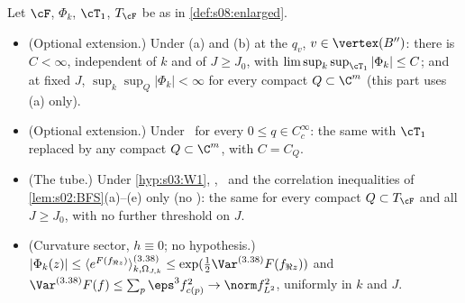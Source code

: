 \begin{lemma}\label{lem:s08:claim4}
Let $\cF$, $\Phi_k$, $\cT_1$, $T_\cF$ be as in \cref{def:s08:enlarged}.
\begin{itemize}[leftmargin=*,nosep]
\item[(A)] \textup{(Optional extension.)} Under \Wtwo(a) and \Wtwo(b) at the $q_v$, $v\in\vertex(B'')$: there is $C<\infty$, independent of $k$ and of $J\ge J_0$, with $\limsup_k\sup_{\cT_1}|\Phi_k|\le C$; and at fixed $J$, $\sup_k\sup_Q|\Phi_k|<\infty$ for every compact $Q\subset\C^m$ (this part uses \Wtwo(a) only).
\item[(A$_\infty$)] \textup{(Optional extension.)} Under \Wtwo\ for every $0\le q\in C^\infty_c$: the same with $\cT_1$ replaced by any compact $Q\subset\C^m$, with $C=C_Q$.
\item[(T)] \textup{(The tube.)} Under \cref{hyp:s03:W1}, \Itwo, \Ithree\ and the correlation inequalities of \cref{lem:s02:BFS}(a)--(e) only (no \Wtwo): the same for every compact $Q\subset T_\cF$ and all $J\ge J_0$, with no further threshold on $J$.
\item[(C)] \textup{(Curvature sector, $h\equiv0$; no hypothesis.)} $|\Phi_k(z)|\le\langle e^{F(f_{\Re z})}\rangle^{(3.38)}_{k,\Omega_{J,k}}\le\exp(\tfrac12\Var^{(3.38)}F(f_{\Re z}))$ and $\Var^{(3.38)}F(f)\le\sum_p\eps^3f_{c(p)}^2\to\norm f_{L^2}^2$, uniformly in $k$ and $J$.
\end{itemize}
\end{lemma}

